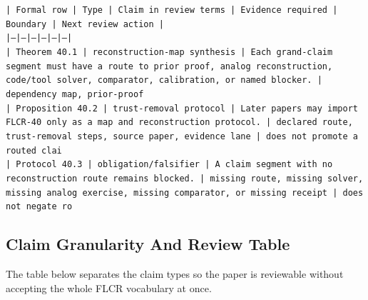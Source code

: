 \documentclass[11pt]{article}
\begin{document}
\noindent\texttt{| Formal row | Type | Claim in review terms | Evidence required | Boundary | Next review action |}\\
\noindent\texttt{|---|---|---|---|---|---|}\\
\noindent\texttt{| Theorem 40.1 | reconstruction-map synthesis | Each grand-claim segment must have a route to prior proof, analog reconstruction, code/tool solver, comparator, calibration, or named blocker. | dependency map, prior-proof}\\
\noindent\texttt{| Proposition 40.2 | trust-removal protocol | Later papers may import FLCR-40 only as a map and reconstruction protocol. | declared route, trust-removal steps, source paper, evidence lane | does not promote a routed clai}\\
\noindent\texttt{| Protocol 40.3 | obligation/falsifier | A claim segment with no reconstruction route remains blocked. | missing route, missing solver, missing analog exercise, missing comparator, or missing receipt | does not negate ro}\\


\subsection*{Claim Granularity And Review Table}

The table below separates the claim types so the paper is reviewable without accepting the whole FLCR vocabulary at once.
\end{document}
